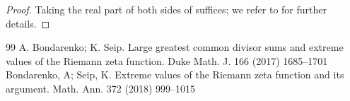 \documentclass[10pt,a4paper]{amsart}
\numberwithin{equation}{section}
\begin{document}
\begin{proof}
    Taking the real part of both sides of \cite[Lemma 6, Eq. (23)]{bondarenko2018argument} suffices; we refer to \cite[p. 1699]{bondarenko2017large} for further details.
\end{proof}


\begin{thebibliography}{99}
 A. Bondarenko; K. Seip. Large greatest common divisor sums and extreme values of the {R}iemann zeta function. Duke Math. J. 166 (2017) 1685--1701
 Bondarenko, A; Seip, K. Extreme values of the {R}iemann zeta function and its argument. Math. Ann. 372 (2018) 999--1015
\end{thebibliography}
\end{document}
